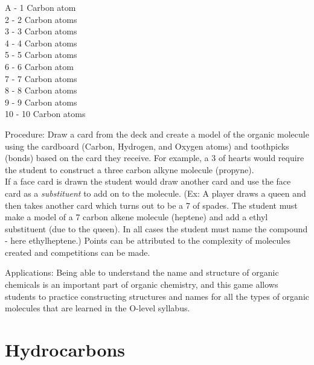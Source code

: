 \begin{multicols}{2}
\begin{description*}
{A - 1 Carbon atom\\
2 - 2 Carbon atoms\\
3 - 3 Carbon atoms\\
4 - 4 Carbon atoms\\
5 - 5 Carbon atoms\\
6 - 6 Carbon atom\\
7 - 7 Carbon atoms\\
8 - 8 Carbon atoms\\
9 - 9 Carbon atoms\\
10 - 10 Carbon atoms\\}
\item[Procedure:]{Draw a card from the deck and create a model of the organic molecule using the cardboard (Carbon, Hydrogen, and Oxygen atoms) and toothpicks (bonds) based on the card they receive. For example, a 3 of hearts would require the student to construct a three carbon alkyne molecule (propyne). \\

If a face card is drawn the student would draw another card and use the face card as a \emph{substituent} to add on to the molecule. (Ex: A player draws a queen and then takes another card which turns out to be a 7 of spades. The student must make a model of a 7 carbon alkene molecule (heptene) and add a ethyl substituent (due to the queen). In all cases the student must name the compound - here ethylheptene.) Points can be attributed to the complexity of molecules created and competitions can be made.}
\item[Applications:]{Being able to understand the name and structure of organic chemicals is an important part of organic chemistry, and this game allows students to practice constructing structures and names for all the types of organic molecules that are learned in the O-level syllabus.}
\end{description*}

\columnbreak


\section*{Hydrocarbons} 



\end{multicols}
